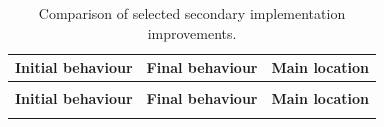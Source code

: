 \begingroup
\small
\renewcommand{\arraystretch}{1.12}
\setlength{\tabcolsep}{3pt}
\begin{longtable}{|>{\raggedright\arraybackslash}p{}|>{\raggedright\arraybackslash}p{}|>{\raggedright\arraybackslash}p{}|}
    \caption{Comparison of selected secondary implementation improvements.}
    \label{tab:appendix_secondary_improvements}\\
    \hline
    \textbf{Initial behaviour} & \textbf{Final behaviour} & \textbf{Main location} \\
    \hline
    \endfirsthead

    \multicolumn{3}{c}{\tablename\ \thetable\ -- continued}\\
    \hline
    \textbf{Initial behaviour} & \textbf{Final behaviour} & \textbf{Main location} \\
    \hline
    \endhead

    \hline
    \endfoot


\end{longtable}
